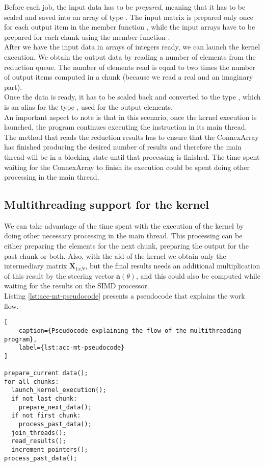 Before each job, the input data has to be \textit{prepared}, meaning that it has
to be scaled and saved into an array of type . The input matrix
is prepared only once for each output item in the member function
, while the input arrays have to be prepared for each
chunk using the member function . \\

After we have the input data in arrays of integers ready, we can launch the
kernel execution. We obtain the output data by reading a number of elements from the
reduction queue. The number of elements read is equal to two times the number of
output items computed in a chunk (because we read a real and an imaginary part). \\

Once the data is ready, it has to be scaled back and converted to the
type , which is an alias for the type
, used for the output elements. \\

An important aspect to note is that in this scenario, once the kernel execution
is launched, the program continues executing the instruction in its main thread.
The method that reads the reduction results has to ensure that the ConnexArray
has finished producing the desired number of results and therefore the main
thread will be in a blocking state until that processing is finished. The time
spent waiting for the ConnexArray to finish its execution could be spent doing
other processing in the main thread.

\subsection{Multithreading support for the kernel}

We can take advantage of the time spent with the execution of the kernel by
doing other necessary processing in the main thread. This processing can be
either preparing the elements for the next chunk, preparing the output for the
past chunk or both. Also, with the aid of the kernel we obtain only the
intermediary matrix $\bm{X}_{1xN}$, but the final results needs an additional
multiplication of this result by the steering vector $\bm{a}(\theta)$, and this
could also be computed while waiting for the results on the SIMD processor. \\

Listing \ref{lst:acc-mt-pseudocode} presents a pseudocode that explains the work
flow.
\begin{lstlisting}[
    caption={Pseudocode explaining the flow of the multithreading program},
    label={lst:acc-mt-pseudocode}
]

prepare_current data();
for all chunks:
  launch_kernel_execution();
  if not last chunk:
    prepare_next_data();
  if not first chunk:
    process_past_data();
  join_threads();
  read_results();
  increment_pointers();
process_past_data();
\end{lstlisting}

